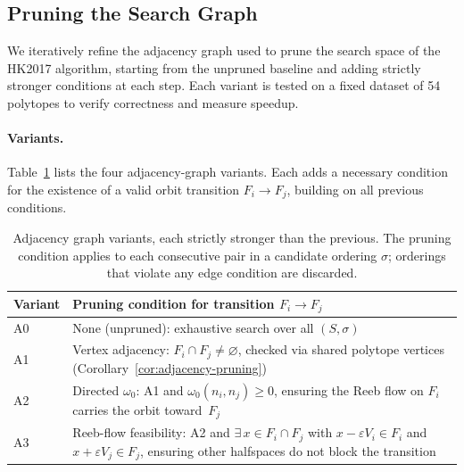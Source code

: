 %
%
%

\subsection{Pruning the Search Graph}
\label{sec:ablation-pruning}

We iteratively refine the adjacency graph used to prune the search space
of the HK2017 algorithm, starting from the unpruned baseline and adding
strictly stronger conditions at each step. Each variant is tested on a
fixed dataset of 54 polytopes to verify correctness and measure speedup.

\paragraph{Variants.}
Table~\ref{tab:ablation-variants} lists the four adjacency-graph variants.
Each adds a necessary condition for the existence of a valid orbit transition
$F_i \to F_j$, building on all previous conditions.

\begin{table}[h]
\centering
\begin{tabular}{lp{9cm}}
\toprule
Variant & Pruning condition for transition $F_i \to F_j$ \\
\midrule
A0 & None (unpruned): exhaustive search over all $(S, \sigma)$ \\
A1 & Vertex adjacency: $F_i \cap F_j \neq \varnothing$, checked via shared polytope vertices (Corollary~\ref{cor:adjacency-pruning}) \\
A2 & Directed $\omega_0$: A1 and $\omega_0(n_i, n_j) \ge 0$, ensuring the Reeb flow on $F_i$ carries the orbit toward~$F_j$ \\
A3 & Reeb-flow feasibility: A2 and $\exists\, x \in F_i \cap F_j$ with $x - \varepsilon V_i \in F_i$ and $x + \varepsilon V_j \in F_j$, ensuring other halfspaces do not block the transition \\
\bottomrule
\end{tabular}
\caption{Adjacency graph variants, each strictly stronger than the previous.
  The pruning condition applies to each consecutive pair in a candidate ordering
  $\sigma$; orderings that violate any edge condition are discarded.}
\label{tab:ablation-variants}
\end{table}

